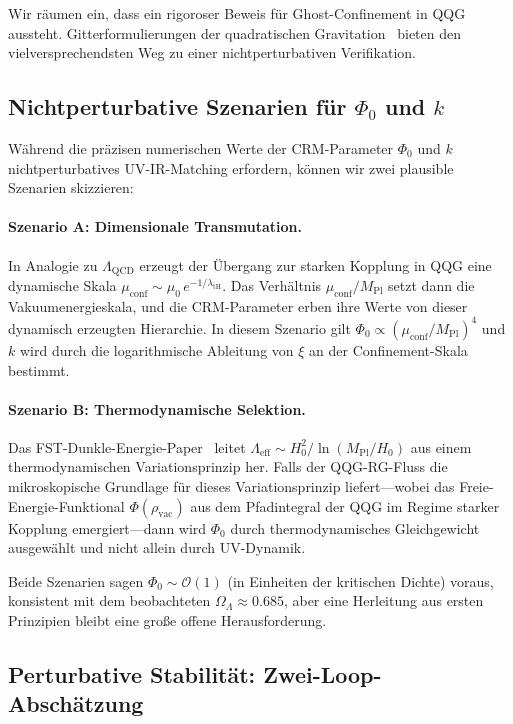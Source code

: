 \documentclass[aps,prd,twocolumn,superscriptaddress,nofootinbib]{revtex4-2}
\begin{document}
Wir räumen ein, dass ein rigoroser Beweis für Ghost-Confinement in QQG aussteht. Gitterformulierungen der quadratischen Gravitation~\cite{HoldomRen2016} bieten den vielversprechendsten Weg zu einer nichtperturbativen Verifikation.

\subsection{Nichtperturbative Szenarien für $\Phi_0$ und $k$}
\label{sec:nonperturbative}

Während die präzisen numerischen Werte der CRM-Parameter $\Phi_0$ und $k$ nichtperturbatives UV-IR-Matching erfordern, können wir zwei plausible Szenarien skizzieren:

\paragraph{Szenario A: Dimensionale Transmutation.}
In Analogie zu $\Lambda_\mathrm{QCD}$ erzeugt der Übergang zur starken Kopplung in QQG eine dynamische Skala $\mu_\mathrm{conf} \sim \mu_0\,e^{-1/\lambda_\mathrm{tH}}$. Das Verhältnis $\mu_\mathrm{conf}/M_\mathrm{Pl}$ setzt dann die Vakuumenergieskala, und die CRM-Parameter erben ihre Werte von dieser dynamisch erzeugten Hierarchie. In diesem Szenario gilt $\Phi_0 \propto (\mu_\mathrm{conf}/M_\mathrm{Pl})^4$ und $k$ wird durch die logarithmische Ableitung von $\xi$ an der Confinement-Skala bestimmt.

\paragraph{Szenario B: Thermodynamische Selektion.}
Das FST-Dunkle-Energie-Paper~\cite{GeigerDE2026} leitet $\Lambda_\mathrm{eff} \sim H_0^2/\ln(M_\mathrm{Pl}/H_0)$ aus einem thermodynamischen Variationsprinzip her. Falls der QQG-RG-Fluss die mikroskopische Grundlage für dieses Variationsprinzip liefert---wobei das Freie-Energie-Funktional $\Phi(\rho_\mathrm{vac})$ aus dem Pfadintegral der QQG im Regime starker Kopplung emergiert---dann wird $\Phi_0$ durch thermodynamisches Gleichgewicht ausgewählt und nicht allein durch UV-Dynamik.

Beide Szenarien sagen $\Phi_0 \sim \mathcal{O}(1)$ (in Einheiten der kritischen Dichte) voraus, konsistent mit dem beobachteten $\Omega_\Lambda \approx 0.685$, aber eine Herleitung aus ersten Prinzipien bleibt eine große offene Herausforderung.

\subsection{Perturbative Stabilität: Zwei-Loop-Abschätzung}
\label{sec:two-loop}
\end{document}
